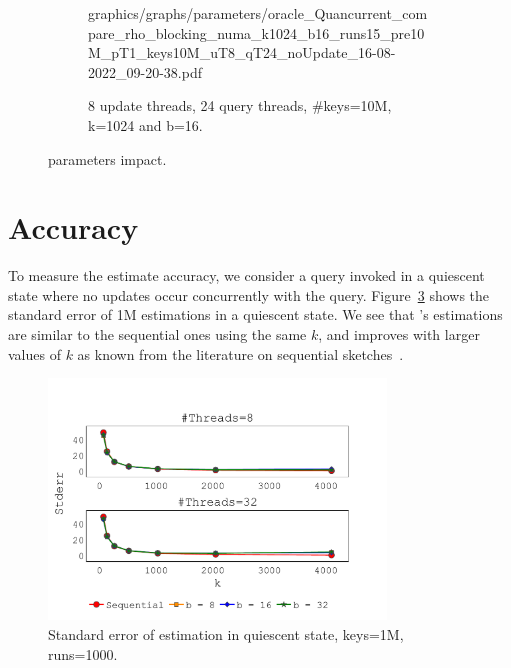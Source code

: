 \begin{figure}[htp!]
\begin{subfigure}{\textwidth}
    {graphics/graphs/parameters/oracle_Quancurrent_compare_rho_blocking_numa_k1024_b16_runs15_pre10M_pT1_keys10M_uT8_qT24_noUpdate_16-08-2022_09-20-38.pdf}
    \caption{8 update threads, 24 query threads, \#keys=10M, k=1024 and b=16.}
    \label{fig: update_query_compare_rho}
    \end{subfigure}
\caption{\mysketch parameters impact.}
\label{fig: parameters_exploration}
\end{figure}

\section{Accuracy}
\label{sec:accuracy} 
To measure the estimate accuracy, we consider a query invoked in a quiescent state where no updates occur concurrently with the query. 
Figure~\ref{fig: accuracy_stderr} shows the standard error of 1M estimations in a quiescent state.
We see that \mysketch's estimations are similar to the sequential ones using the same $k$, and improves with larger values of $k$ as known from the literature on sequential sketches~\cite{mergeables_summaries}.
\begin{figure}[h!]
    \centering
    \includegraphics[width=0.8\textwidth,trim={0 0cm 0cm 1.7cm},clip]
    {graphics/graphs/accuracy/oracle_Quancurrent_block_numa_query_hist_stderr_qs_keys983040_runs1000_k_64_128_256_512_1024_2048_4096_b_8_16_32_T_8_32_11-08-2022_20-26-21.pdf}
    \caption{Standard error of estimation in quiescent state, keys=1M, runs=1000.}
    \label{fig: accuracy_stderr}
\end{figure}

